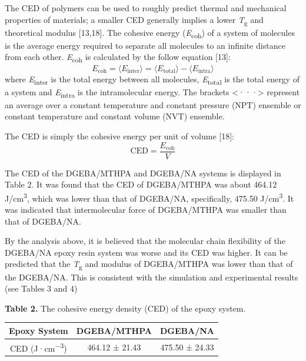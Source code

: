 \documentclass{article}
\begin{document}
The CED of polymers can be used to roughly predict thermal and mechanical properties of materials; a smaller CED generally implies a lower \emph{T}\textsubscript{g} and theoretical modulus [13,18]. The cohesive energy (\emph{E}\textsubscript{coh}) of a system of molecules is the average energy required to separate all molecules to an infinite distance from each other. \emph{E}\textsubscript{coh} is calculated by the follow equation [13]:
\begin{equation}
E_{\mathrm{coh}} = \langle E_{\mathrm{inter}}\rangle = \langle E_{\mathrm{total}}\rangle - \langle E_{\mathrm{intra}}\rangle
\tag{1}
\end{equation}
where \emph{E}\textsubscript{inter} is the total energy between all molecules, \emph{E}\textsubscript{total} is the total energy of a system and \emph{E}\textsubscript{intra} is the intramolecular energy. The brackets <···> represent an average over a constant temperature and constant pressure (NPT) ensemble or constant temperature and constant volume (NVT) ensemble.

The CED is simply the cohesive energy per unit of volume [18]:
\begin{equation}
\mathrm{CED} = \frac{E_{\mathrm{coh}}}{V}
\tag{2}
\end{equation}

The CED of the DGEBA/MTHPA and DGEBA/NA systems is displayed in Table 2. It was found that the CED of DGEBA/MTHPA was about 464.12 J/cm\textsuperscript{3}, which was lower than that of DGEBA/NA, specifically, 475.50 J/cm\textsuperscript{3}. It was indicated that intermolecular force of DGEBA/MTHPA was smaller than that of DGEBA/NA.

By the analysis above, it is believed that the molecular chain flexibility of the DGEBA/NA epoxy resin system was worse and its CED was higher. It can be predicted that the \emph{T}\textsubscript{g} and modulus of DGEBA/MTHPA was lower than that of the DGEBA/NA. This is consistent with the simulation and experimental results (see Tables 3 and 4)

\begin{center}
\noindent\textbf{Table 2.} The cohesive energy density (CED) of the epoxy system.

\smallskip
\begin{tabular}{ccc}
\toprule
\textbf{Epoxy System} & \textbf{DGEBA/MTHPA} & \textbf{DGEBA/NA} \\
\midrule
CED (J·cm\textsuperscript{−3}) & 464.12 ± 21.43 & 475.50 ± 24.33 \\
\bottomrule
\end{tabular}
\end{center}
\end{document}
